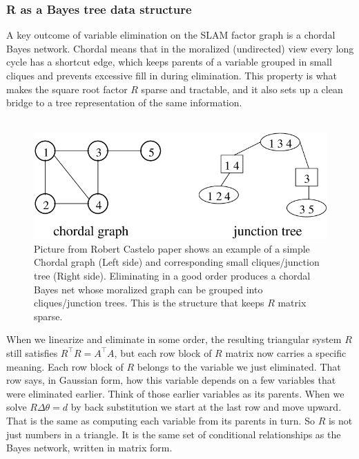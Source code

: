 \subsubsection{R as a Bayes tree data structure}
A key outcome of variable elimination on the SLAM factor graph is a chordal Bayes network. Chordal means that in the moralized (undirected) view every long cycle has a shortcut edge, which keeps parents of a variable grouped in small cliques and prevents excessive fill in during elimination. This property is what makes the square root factor $R$ sparse and tractable, and it also sets up a clean bridge to a tree representation of the same information. \cite{iSAM2_paper,Bayes_tree_for_SLAM_paper}
\\ \\
\begin{figure}[H]
    \centering
    \includegraphics[width=0.98\linewidth]{Pictures/Optimizers/iSAM2/chodar_graph_to_junction_tree_example.png}
    \caption{Picture from Robert Castelo paper \cite{chordal_graph_to_junction_tree_paper} shows an example of a simple Chordal graph (Left side) and corresponding small cliques/junction tree (Right side). Eliminating in a good order produces a chordal Bayes net whose moralized graph can be grouped into cliques/junction trees. This is the structure that keeps $R$ matrix sparse.}
    \label{fig:optimizer-iSAM2-chordal}
\end{figure}
\noindent
When we linearize and eliminate in some order, the resulting triangular system $R$ still satisfies $R^\top R = A^\top A$, but each row block of $R$ matrix now carries a specific meaning. Each row block of $R$ belongs to the variable we just eliminated. That row says, in Gaussian form, how this variable depends on a few variables that were eliminated earlier. Think of those earlier variables as its parents. When we solve $R\Delta\theta=d$ by back substitution we start at the last row and move upward. That is the same as computing each variable from its parents in turn. So $R$ is not just numbers in a triangle. It is the same set of conditional relationships as the Bayes network, written in matrix form.
